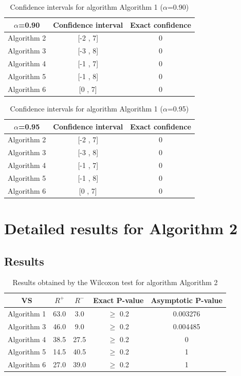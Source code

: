 \documentclass[a4paper,10pt]{article}
\begin{document}
\begin{table}[!htp]
\centering\small
\begin{tabular}{
|c|c|c|}
\hline
 $\alpha$=0.90 & Confidence interval & Exact confidence \\ \hline 
Algorithm 2 & [-2 , 7] & 0\\ \hline 
Algorithm 3 & [-3 , 8] & 0\\ \hline 
Algorithm 4 & [-1 , 7] & 0\\ \hline 
Algorithm 5 & [-1 , 8] & 0\\ \hline 
Algorithm 6 & [0 , 7] & 0\\ \hline 

\end{tabular}
\caption{Confidence intervals for algorithm Algorithm 1 ($\alpha$=0.90)}
\end{table}
\begin{table}[!htp]
\centering\small
\begin{tabular}{
|c|c|c|}
\hline
 $\alpha$=0.95 & Confidence interval & Exact confidence \\ \hline 
Algorithm 2 & [-2 , 7] & 0\\ \hline 
Algorithm 3 & [-3 , 8] & 0\\ \hline 
Algorithm 4 & [-1 , 7] & 0\\ \hline 
Algorithm 5 & [-1 , 8] & 0\\ \hline 
Algorithm 6 & [0 , 7] & 0\\ \hline 

\end{tabular}
\caption{Confidence intervals for algorithm Algorithm 1 ($\alpha$=0.95)}
\end{table}

 \clearpage 


\section{Detailed results for Algorithm 2}


\subsection{Results}

\begin{table}[!htp]
\centering\small
\begin{tabular}{
|c|c|c|c|c|}
\hline
 VS & $R^{+}$ & $R^{-}$ & Exact P-value & Asymptotic P-value \\ \hline 
Algorithm 1 & 63.0 & 3.0 & $\geq$ 0.2 & 0.003276\\ \hline 
Algorithm 3 & 46.0 & 9.0 & $\geq$ 0.2 & 0.004485\\ \hline 
Algorithm 4 & 38.5 & 27.5 & $\geq$ 0.2 & 0\\ \hline 
Algorithm 5 & 14.5 & 40.5 & $\geq$ 0.2 & 1\\ \hline 
Algorithm 6 & 27.0 & 39.0 & $\geq$ 0.2 & 1\\ \hline 

\end{tabular}
\caption{Results obtained by the Wilcoxon test for algorithm Algorithm 2}
\end{table}
\end{document}
